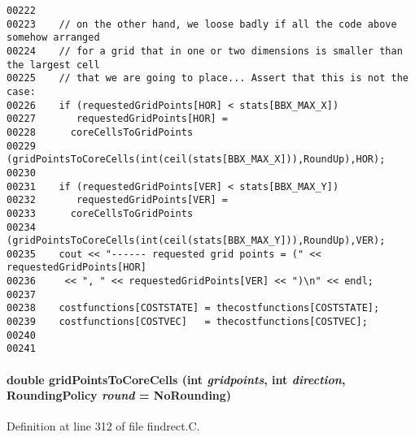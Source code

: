 \begin{verbatim}
00222 
00223    // on the other hand, we loose badly if all the code above somehow arranged
00224    // for a grid that in one or two dimensions is smaller than the largest cell
00225    // that we are going to place... Assert that this is not the case:
00226    if (requestedGridPoints[HOR] < stats[BBX_MAX_X])
00227       requestedGridPoints[HOR] =
00228      coreCellsToGridPoints
00229      (gridPointsToCoreCells(int(ceil(stats[BBX_MAX_X])),RoundUp),HOR);
00230 
00231    if (requestedGridPoints[VER] < stats[BBX_MAX_Y])
00232       requestedGridPoints[VER] =
00233      coreCellsToGridPoints
00234      (gridPointsToCoreCells(int(ceil(stats[BBX_MAX_Y])),RoundUp),VER);
00235    cout << "------ requested grid points = (" << requestedGridPoints[HOR]
00236     << ", " << requestedGridPoints[VER] << ")\n" << endl;
00237 
00238    costfunctions[COSTSTATE] = thecostfunctions[COSTSTATE];
00239    costfunctions[COSTVEC]   = thecostfunctions[COSTVEC];
00240 
00241 
\end{verbatim}\normalsize 
\label{findrect.C_a19}
\paragraph{\setlength{\rightskip}{0pt plus 5cm}double grid\-Points\-To\-Core\-Cells (int {\em gridpoints}, int {\em direction}, {\bf Rounding\-Policy} {\em round} = No\-Rounding)\hspace{0.3cm}{\tt  [static]}}\hfill



Definition at line 312 of file findrect.C.

